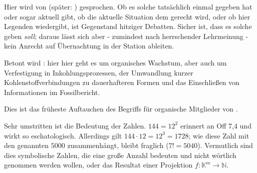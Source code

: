 \label{sec:carbon}


Hier wird  von  (später: ) gesprochen. 
Ob es solche tatsächlich einmal gegeben hat oder sogar aktuell gibt, ob die aktuelle Situation dem gerecht wird,
oder ob  hier Legenden wiedergibt, ist Gegenstand hitziger Debatten. 
Sicher ist, dass es solche geben \emph{soll}; daraus lässt sich aber - zumindest nach herrschender Lehrmeinung - kein Anrecht auf Übernachtung in der Station ableiten.

Betont wird : hier hier geht es um organisches Wachstum, aber auch um Verfestigung in Inkohlungsprozessen, der Umwandlung kurzer Kohlenstoffverbindungen zu dauerhafteren Formen und das Einschließen von Informationen im Fossilbericht.


Dies ist das früheste Auftauchen des Begriffs  für organische Mitglieder von .

Sehr umstritten ist die Bedeutung der Zahlen. $144=12^2$ erinnert an Off 7,4 und wirkt so eschatologisch. Allerdings gilt $144\cdot12=12^3=1728$; wie diese Zahl mit den genannten $5000$  zusammenhängt, bleibt fraglich ($7!= 5040$). Vermutlich sind dies symbolische Zahlen, die eine große Anzahl bedeuten und nicht wörtlich genommen werden wollen, oder das Resultat einer Projektion $f: \mathbb{K}^m\rightarrow\mathbb{N}$. 

